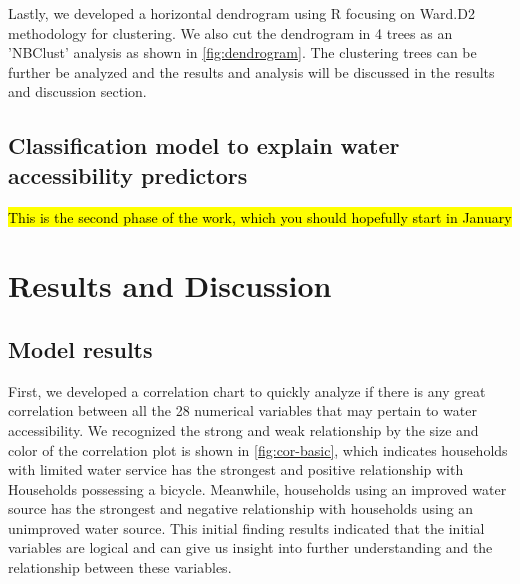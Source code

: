 \documentclass[10pt,twoside]{article}
\numberwithin{equation}{section}
\newcommand{\?}{\stackrel{?}{=}}
\begin{document}
Lastly, we developed a horizontal dendrogram using R focusing on Ward.D2 methodology for clustering. We also cut the dendrogram in 4 trees as an 'NBClust' analysis as shown in \autoref{fig:dendrogram}. The clustering trees can be further be analyzed and the results and analysis will be discussed in the results and discussion section. 



\subsection{Classification model to explain water accessibility predictors}
\hl{This is the second phase of the work, which you should hopefully start in January}


\section{Results and Discussion}

\subsection{Model results}
First, we developed a correlation chart to quickly analyze if there is any great correlation between all the 28 numerical variables that may pertain to water accessibility. We recognized the strong and weak relationship by the size and color of the correlation plot is shown in \autoref{fig:cor-basic}, which indicates households with limited water service has the strongest and positive relationship with Households possessing a bicycle. Meanwhile, households using an improved water source has the strongest and negative relationship with households using an unimproved water source. This initial finding results indicated that the initial variables are logical and can give us insight into further understanding and the relationship between these variables. 
\end{document}
